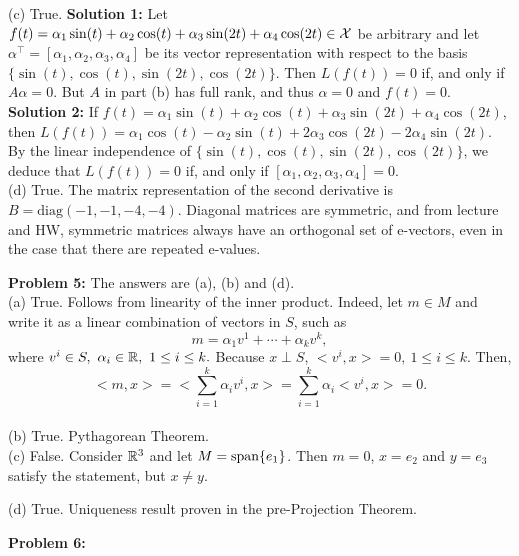 \documentclass[letterpaper]{article}
\begin{document}
(c) True. \textbf{Solution 1:} Let $f(t) = \alpha_1 \sin(t) +  \alpha_2 \cos(t) +  \alpha_3 \sin(2t) +  \alpha_4 \cos(2t) \in {\cal X}$
be arbitrary and let $\alpha^\top =[\alpha_1, \alpha_2, \alpha_3, \alpha_4]$ be its vector representation with respect to the basis  $\{ \sin(t), \cos(t), \sin(2t), \cos(2t) \}$. Then $L(f(t)) = 0$
if, and only if $A \alpha =0$. But $A$ in part (b) has full rank, and thus $\alpha =0$ and $f(t) = 0$. \\

\textbf{Solution 2:} If $f(t) = \alpha_1 \sin(t) +  \alpha_2 \cos(t) +  \alpha_3 \sin(2t) +  \alpha_4 \cos(2t)$, then  $L(f(t)) = \alpha_1 \cos(t) -  \alpha_2 \sin(t) +  2 \alpha_3 \cos(2t) -2  \alpha_4 \sin(2t)$. By the linear independence of  $\{ \sin(t), \cos(t), \sin(2t), \cos(2t) \}$, we deduce that $L(f(t))= 0$ if, and only if $[\alpha_1, \alpha_2, \alpha_3, \alpha_4]=0$.\\

(d) True. The matrix representation of the second derivative is $B=\mathrm{diag}  (-1, -1, -4, -4)$. Diagonal matrices are symmetric, and from lecture and HW, symmetric matrices always have an orthogonal set of e-vectors, even in the case that there are repeated e-values.

\bigskip

\noindent \textbf{Problem 5:} The answers are (a), (b) and (d). \\

(a) True. Follows from linearity of the inner product. Indeed, let $m\in M$ and write it as a linear combination of vectors in  $S$, such as $$ m = \alpha_1v^1 + \cdots + \alpha_k v^k,$$
where $v^i \in S,~ \alpha_i \in \mathbb R, ~1 \le i \le k.$ Because $x \perp S$, $<v^i,x>=0, ~1 \le i \le k.$ Then,
$$<m,x> = <\sum_{i=1}^k \alpha_i v^i, x> = \sum_{i=1}^k \alpha_i <v^i, x>=0. $$\\

(b) True. Pythagorean Theorem.\\

(c) False. Consider $\mathbb R^3$ and let $M=\textrm{span} \{ e_1 \}$. Then $m=0$, $x=e_2$ and $y=e_3$ satisfy the statement, but $x\neq y$.

(d) True. Uniqueness result proven in the pre-Projection Theorem. \\

\newpage

\noindent \textbf{Problem 6:} \\
\end{document}
